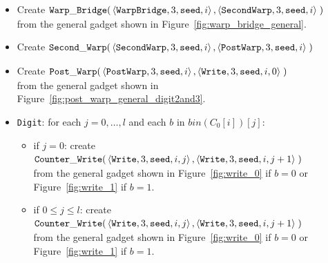\begin{itemize}
    \item Create
    $\begin{aligned}[t]
        {\tt Warp\_Bridge}(&\left\langle {\tt WarpBridge}, 3, {\tt seed}, i \right\rangle,
                     \left\langle {\tt SecondWarp}, 3, {\tt seed}, i \right\rangle \;)
    \end{aligned}$\\ from the general gadget shown in Figure~\ref{fig:warp_bridge_general}.

    \item Create
    $\begin{aligned}[t]
        {\tt Second\_Warp}(&\left\langle {\tt SecondWarp}, 3, {\tt seed}, i  \right\rangle,
                     \left\langle {\tt PostWarp},   3, {\tt seed}, i  \right\rangle \;)
    \end{aligned}$

    \item Create
    $\begin{aligned}[t]
        {\tt Post\_Warp}(&\left\langle {\tt PostWarp}, 3, {\tt seed}, i    \right\rangle,
                   \left\langle {\tt Write},    3, {\tt seed}, i, 0 \right\rangle \;)
    \end{aligned}$\\from the general gadget shown in Figure~\ref{fig:post_warp_general_digit2and3}.


    \item {\tt Digit}: for each $j=0,\ldots,l$ and each $b$ in $bin(C_0[i])[j]$:
    \begin{itemize}
        \item if $j = 0$: create
        $\begin{aligned}[t]
            {\tt Counter\_Write}(&\left\langle {\tt Write}, 3, {\tt seed}, i, j \right\rangle, \left\langle {\tt Write}, 3, {\tt seed}, i, j + 1  \right\rangle \;)
        \end{aligned}$\\from the general gadget shown in Figure~\ref{fig:write_0} if $b = 0$ or Figure~\ref{fig:write_1} if $b = 1$.

        \item if $0 \leqslant j \leqslant l$: create
        $\begin{aligned}[t]
            {\tt Counter\_Write}(&\left\langle {\tt Write}, 3, {\tt seed}, i, j \right\rangle, \left\langle {\tt Write}, 3, {\tt seed}, i, j + 1 \right\rangle \;)
        \end{aligned}$\\from the general gadget shown in Figure~\ref{fig:write_0} if $b = 0$ or Figure~\ref{fig:write_1} if $b = 1$.


\end{itemize}
\end{itemize}

